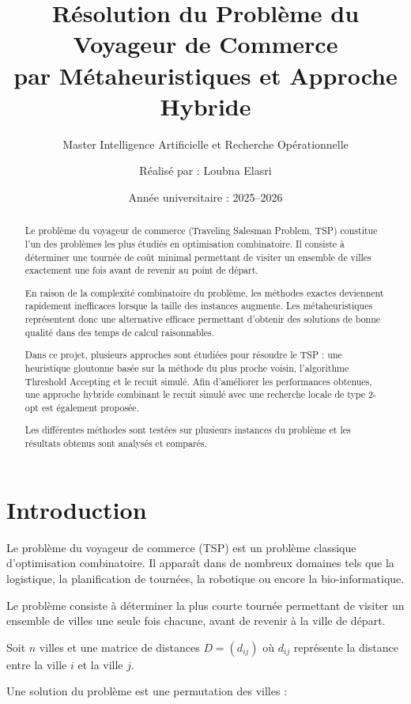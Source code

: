 \documentclass[11pt,a4paper]{article}
\title{Résolution du Problème du Voyageur de Commerce \\ par Métaheuristiques et Approche Hybride}
\author{Master Intelligence Artificielle et Recherche Opérationnelle}
\author{Réalisé par : Loubna Elasri}
\date{Année universitaire : 2025--2026}
\begin{document}
	
	\maketitle
	
	\begin{abstract}
		
		Le problème du voyageur de commerce (Traveling Salesman Problem, TSP) constitue l'un des problèmes les plus étudiés en optimisation combinatoire.
		Il consiste à déterminer une tournée de coût minimal permettant de visiter un ensemble de villes exactement une fois avant de revenir au point de départ.
		
		En raison de la complexité combinatoire du problème, les méthodes exactes deviennent rapidement inefficaces lorsque la taille des instances augmente.
		Les métaheuristiques représentent donc une alternative efficace permettant d'obtenir des solutions de bonne qualité dans des temps de calcul raisonnables.
		
		Dans ce projet, plusieurs approches sont étudiées pour résoudre le TSP : une heuristique gloutonne basée sur la méthode du plus proche voisin, l'algorithme Threshold Accepting et le recuit simulé.
		Afin d'améliorer les performances obtenues, une approche hybride combinant le recuit simulé avec une recherche locale de type 2-opt est également proposée.
		
		Les différentes méthodes sont testées sur plusieurs instances du problème et les résultats obtenus sont analysés et comparés.
		
	\end{abstract}
	\section{Introduction}
	
	Le problème du voyageur de commerce (TSP) est un problème classique d'optimisation combinatoire.
	Il apparaît dans de nombreux domaines tels que la logistique, la planification de tournées, la robotique ou encore la bio-informatique.
	
	Le problème consiste à déterminer la plus courte tournée permettant de visiter un ensemble de villes une seule fois chacune, avant de revenir à la ville de départ.
	
	Soit $n$ villes et une matrice de distances $D=(d_{ij})$ où $d_{ij}$ représente la distance entre la ville $i$ et la ville $j$.
	
	Une solution du problème est une permutation des villes :
	
\end{document}
